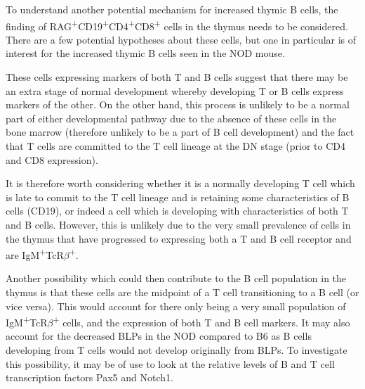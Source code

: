To understand another potential mechanism for increased thymic B cells, the finding of RAG\textsuperscript{+}CD19\textsuperscript{+}CD4\textsuperscript{+}CD8\textsuperscript{+} cells in the thymus needs to be considered.
There are a few potential hypotheses about these cells, but one in particular is of interest for the increased thymic B cells seen in the NOD mouse.

These cells expressing markers of both T and B cells suggest that there may be an extra stage of normal development whereby developing T or B cells express markers of the other.
On the other hand, this process is unlikely to be a normal part of either developmental pathway due to the absence of these cells in the bone marrow (therefore unlikely to be a part of B cell development) and the fact that T cells are committed to the T cell lineage at the DN stage (prior to CD4 and CD8 expression).

It is therefore worth considering whether it is a normally developing T cell which is late to commit to the T cell lineage and is retaining some characteristics of B cells (CD19), or indeed a cell which is developing with characteristics of both T and B cells.
However, this is unlikely due to the very small prevalence of cells in the thymus that have progressed to expressing both a T and B cell receptor and are IgM\textsuperscript{+}TcR$\beta$\textsuperscript{+}.

Another possibility which could then contribute to the B cell population in the thymus is that these cells are the midpoint of a T cell transitioning to a B cell (or vice versa).
This would account for there only being a very small population of IgM\textsuperscript{+}TcR$\beta$\textsuperscript{+} cells, and the expression of both T and B cell markers.
It may also account for the decreased BLPs in the NOD compared to B6 as B cells developing from T cells would not develop originally from BLPs.
To investigate this possibility, it may be of use to look at the relative levels of B and T cell transcription factors Pax5 and Notch1.

